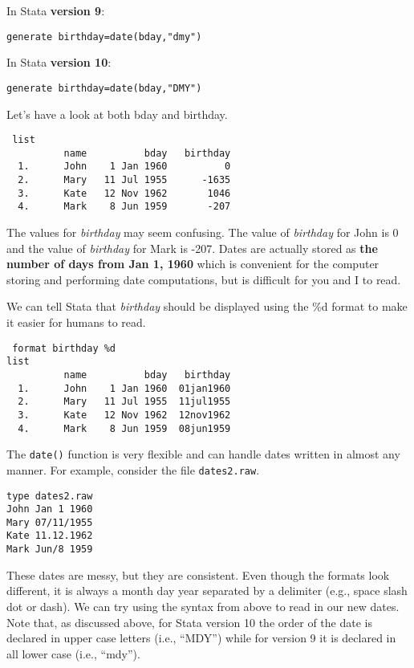 In Stata \textbf{version 9}:

\begin{lstlisting}
generate birthday=date(bday,"dmy")
\end{lstlisting}

In Stata \textbf{version 10}:

\begin{lstlisting}
generate birthday=date(bday,"DMY")
\end{lstlisting}

Let's have a look at both bday and birthday.

\begin{lstlisting}
 list
          name          bday   birthday
  1.      John    1 Jan 1960          0
  2.      Mary   11 Jul 1955      -1635
  3.      Kate   12 Nov 1962       1046
  4.      Mark    8 Jun 1959       -207
 \end{lstlisting}

The values for \textit{birthday} may seem confusing. The value of \textit{birthday} for John is 0 and the value of \textit{birthday} for Mark is -207. Dates are actually stored as \textbf{the number of days from Jan 1, 1960} which is convenient for the computer storing and performing date computations, but is difficult for you and I to read.

We can tell Stata that \textit{birthday} should be displayed using the \%d format to make it easier for humans to read.

\begin{lstlisting}
 format birthday %d
list
          name          bday   birthday
  1.      John    1 Jan 1960  01jan1960
  2.      Mary   11 Jul 1955  11jul1955
  3.      Kate   12 Nov 1962  12nov1962
  4.      Mark    8 Jun 1959  08jun1959
 \end{lstlisting}

The \lstinline{date()} function is very flexible and can handle dates written in almost any manner. For example, consider the file \lstinline{dates2.raw}.

\begin{lstlisting}
type dates2.raw
John Jan 1 1960
Mary 07/11/1955
Kate 11.12.1962
Mark Jun/8 1959
\end{lstlisting}

These dates are messy, but they are consistent. Even though the formats look different, it is always a month day year separated by a delimiter (e.g., space slash dot or dash). We can try using the syntax from above to read in our new dates. Note that, as discussed above, for Stata version 10 the order of the date is declared in upper case letters (i.e., ``MDY'') while for version 9 it is declared in all lower case (i.e., ``mdy'').

